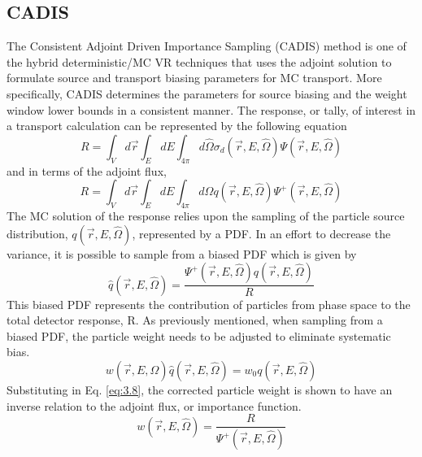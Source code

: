 \subsection{CADIS}
The Consistent Adjoint Driven Importance Sampling (CADIS) method is one of the
hybrid deterministic/MC VR
techniques that uses the adjoint solution to 
formulate source and transport biasing parameters for MC transport.
More specifically, CADIS determines the parameters for source biasing and the
weight window lower bounds in a consistent manner.
The response, or tally, of interest in a transport calculation can be represented by
the following equation
\begin{equation} \label{eq:3.6}
	R = \int_{V}d\overrightarrow{r} \int_{E} dE
	\int_{4\pi} d\widehat{\Omega}
	\sigma_{d}(\overrightarrow{r}, E, \widehat{\Omega})
	\Psi(\overrightarrow{r}, E, \widehat{\Omega})
\end{equation}
and in terms of the adjoint flux, 
\begin{equation} \label{eq:3.7}
	R = \int_{V}d\overrightarrow{r} \int_{E} dE
	\int_{4\pi} d\widehat{\Omega}
	q(\overrightarrow{r}, E, \widehat{\Omega})
	\Psi^{+}(\overrightarrow{r}, E, \widehat{\Omega})
\end{equation}
The MC solution of the response relies upon the sampling of the particle source
distribution, $q(\overrightarrow{r}, E, \widehat{\Omega})$, represented by a PDF.
In an effort to decrease the variance, it is possible to sample from a biased
PDF which is given by
\begin{equation} \label{eq:3.8}
	\widehat{q}(\overrightarrow{r}, E, \widehat{\Omega}) =
	\frac{\Psi^{+}(\overrightarrow{r}, E,\widehat{\Omega})
	q(\overrightarrow{r}, E, \widehat{\Omega})}{R}
\end{equation}
This biased PDF represents the contribution of particles from phase space
to the total detector response, R.
As previously mentioned, when sampling from a biased PDF, the particle weight
needs to be adjusted to eliminate systematic bias.  
\begin{equation} \label{eq:3.9}
	w(\overrightarrow{r}, E,
	\widehat{\Omega})\widehat{q}(\overrightarrow{r}, E, \widehat{\Omega})=
	w_{0}q(\overrightarrow{r}, E, \widehat{\Omega})
\end{equation}
Substituting in Eq. \ref{eq:3.8}, the corrected particle weight is shown to have
an inverse relation to the adjoint flux, or importance function.
\begin{equation} \label{eq:3.10}
	w(\overrightarrow{r}, E, \widehat{\Omega})=
	\frac{R}{\Psi^{+}(\overrightarrow{r}, E, \widehat{\Omega})}
\end{equation}
